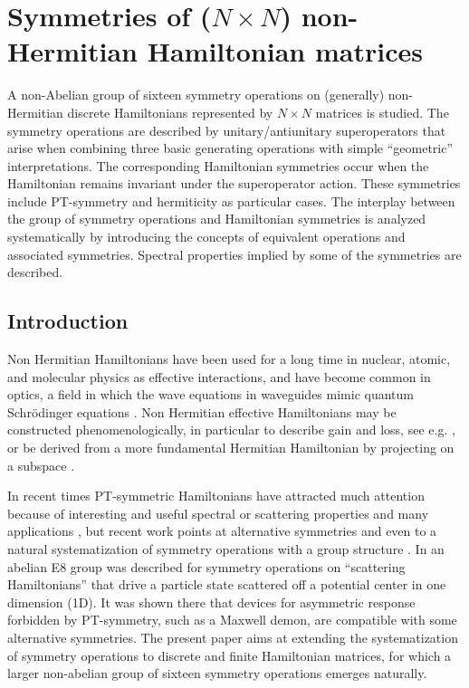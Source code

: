 
\chapter{Symmetries of ($N\times N$) non-Hermitian Hamiltonian matrices}
\label{ChapterNNSymmetries}
%
A non-Abelian group of sixteen symmetry operations on (generally) non-Hermitian
discrete Hamiltonians represented by $N\times N$ matrices is studied. The symmetry operations are described by unitary/antiunitary superoperators that arise  when combining
three basic generating operations with simple ``geometric'' interpretations. The corresponding Hamiltonian symmetries occur when
the Hamiltonian remains invariant under the superoperator action. These symmetries  include PT-symmetry and hermiticity as particular cases.
The interplay between the group of symmetry operations and Hamiltonian symmetries
is analyzed systematically by introducing the concepts of equivalent operations and associated symmetries.
Spectral properties implied by some of the symmetries are described.
%
\newpage
%
\section{Introduction}
%
Non Hermitian Hamiltonians have been used for a long time in nuclear, atomic, and molecular physics
as effective interactions, and have become common in optics, a field in which the wave equations in waveguides mimic  quantum Schr\"odinger equations \cite{Ruschhaupt2005,Longhi2017a,Konotop2016}.
%
Non Hermitian effective Hamiltonians may be constructed phenomenologically, in particular  to describe gain and loss, see e.g.
\cite{Ruschhaupt2005},
or be derived from a more fundamental Hermitian Hamiltonian
by projecting on a subspace \cite{Feshbach1958,Ruschhaupt2004a,Muga2004}.
%

In recent times PT-symmetric Hamiltonians \cite{Bender1998} have attracted much attention because of interesting and useful
spectral or scattering properties and many applications \cite{Longhi2017a,Konotop2016}, but recent work points at alternative symmetries \cite{Nixon2016,Nixon2016a,Chen2017,Ruschhaupt2017,Simon2018,Simon2019a} and even to a natural systematization of symmetry operations with a group structure  \cite{Ruschhaupt2017}. In \cite{Simon2019a} an abelian E8 group was described for symmetry operations on  ``scattering Hamiltonians''
that drive a particle state scattered off a potential center in one dimension (1D). It was shown there that devices for asymmetric response
forbidden by PT-symmetry, such as a  Maxwell demon,  are  compatible with some alternative symmetries. The present paper aims at extending the systematization
of symmetry operations to discrete and finite Hamiltonian matrices, for which a larger non-abelian group
of sixteen symmetry operations emerges naturally.

